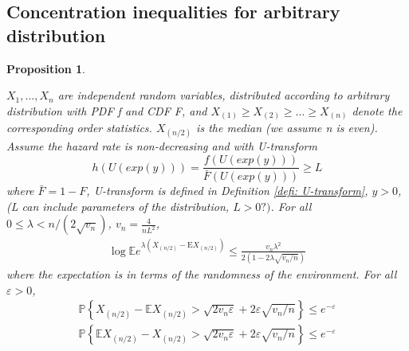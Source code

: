 \documentclass{article}
\theoremstyle{plain}
\newtheorem{prop}{Proposition}
\begin{document}
\subsection{Concentration inequalities for arbitrary distribution}

\begin{prop}
\label{prop: Concentration inequalities for arbitrary distribution}

$X_1, ..., X_n$ are independent random variables, distributed according to arbitrary distribution with PDF f and CDF F, and $X_{(1)} \geq X_{(2)} \geq ... \geq X_{(n)}$ denote the corresponding order statistics. $X_{(n/2)}$ is the median (we assume n is even). Assume the hazard rate is non-decreasing and with U-transform
$$h\left(U(exp(y))\right) = \frac{f\left(U(exp(y))\right)}{\bar{F}\left(U(exp(y))\right) } \geq L$$
where $\bar{F} = 1 - F$, U-transform is defined in Definition \ref{defi: U-transform}, $y > 0$, (L can include parameters of the distribution, $L > 0 ?)$. For all $0 \leq \lambda<n /\left(2 \sqrt{v_{n}}\right)$, $v_n = \frac{4}{n L^2}$,
\begin{align}
    \log \mathbb{E}e^{\lambda\left(X_{(n / 2)}-\mathrm{E} X_{(n / 2)}\right)} \leq \frac{v_{n} \lambda^{2}}{2\left(1-2 \lambda \sqrt{v_{n} / n}\right)}
\end{align}
where the expectation is in terms of the randomness of the environment. For all $\varepsilon > 0$,
\begin{align} 
    \label{inequality Bernstein upper bound for abr}
    \mathbb{P}\left\{X_{(n / 2)}-\mathbb{E} X_{(n / 2)}>\sqrt{2 v_{n} \varepsilon}+2 \varepsilon \sqrt{v_{n} / n}\right\} \leq e^{-\varepsilon}\\
    \label{inequality Bernstein lower bound for abr}
    \mathbb{P}\left\{\mathbb{E} X_{(n / 2)} - X_{(n / 2)}>\sqrt{2 v_{n} \varepsilon}+2 \varepsilon \sqrt{v_{n} / n}\right\} \leq e^{-\varepsilon}
\end{align}
\end{prop}
\end{document}
